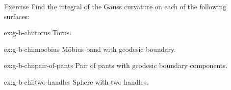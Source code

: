 \begin{thm}{Exercise}\label{ex:g-b-chi}
Find the integral of the Gauss curvature on each of the following surfaces:

\begin{subthm}{ex:g-b-chi:torus}
Torus.
\end{subthm}

\begin{subthm}{ex:g-b-chi:moebius}
Möbius band with geodesic boundary.
\end{subthm}

\begin{subthm}{ex:g-b-chi:pair-of-pants}
Pair of pants with geodesic boundary components.
\end{subthm}

\begin{subthm}{ex:g-b-chi:two-handles}
Sphere with two handles.
\end{subthm}

\end{thm}
